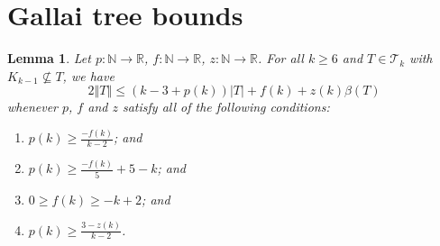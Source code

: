 \documentclass[10pt]{article}
\theoremstyle{plain}
\newtheorem{lem}[thm]{Lemma}
\theoremstyle{definition}
\theoremstyle{remark}
\newcommand{\fancy}[1]{\mathcal{#1}}
\newcommand{\IN}{\mathbb{N}}
\newcommand{\IR}{\mathbb{R}}
\newcommand{\T}{\fancy{T}}
\newcommand{\card}[1]{\left|#1\right|}
\newcommand{\size}[1]{\left\Vert#1\right\Vert}
\newcommand{\func}[3]{#1\colon #2 \rightarrow #3}
\begin{document}
\section{Gallai tree bounds}
\begin{lem}\label{BoundFamilyWithoutKKMinusOne}
	Let $\func{p}{\IN}{\IR}$, $\func{f}{\IN}{\IR}$, $\func{z}{\IN}{\IR}$.
	For all $k \ge 6$ and $T \in \T_k$ with $K_{k-1} \not \subseteq T$, we have
	\[2\size{T} \le (k-3 + p(k))\card{T} + f(k) + z(k)\beta(T)\]
	whenever $p$, $f$ and $z$ satisfy all of the following conditions:
	\begin{enumerate}
		\item $p(k) \ge \frac{-f(k)}{k-2}$; and
		\item $p(k) \ge \frac{-f(k)}{5} + 5 - k$; and
		\item $0\ge f(k)\ge -k+2$; and
		\item $p(k) \ge \frac{3 - z(k)}{k-2}$.
	\end{enumerate}
\end{lem}
\end{document}

